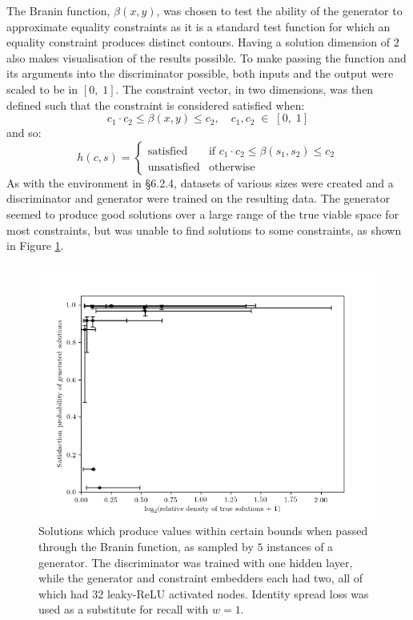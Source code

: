 \documentclass[../../main.tex]{subfiles}
\begin{document}
The Branin function, $\beta(x,y)$, was chosen to test the ability of the generator to approximate equality constraints as it is a standard test function for which an equality constraint produces distinct contours.
Having a solution dimension of $2$ also makes visualisation of the results possible.
To make passing the function and its arguments into the discriminator possible, both inputs and the output were scaled to be in $[0,\;1]$.
The constraint vector, in two dimensions, was then defined such that the constraint is considered satisfied when:
$$c_1\cdot c_2\le\beta(x,y)\le c_2,\quad c_1,c_2\;\in\;[0,\;1]$$
and so:
$$h(c,s)=\left\{\begin{array}{ll}\text{satisfied}&\mbox{if }c_1\cdot c_2\le\beta(s_1,s_2)\le c_2\\\text{unsatisfied}&\mbox{otherwise}\end{array}\right.$$
As with the environment in \S6.2.4, datasets of various sizes were created and a discriminator and generator were trained on the resulting data.
The generator seemed to produce good solutions over a large range of the true viable space for most constraints, but was unable to find solutions to some constraints, as shown in Figure \ref{fig:braninPropertiesW3}.
\begin{figure}[H]
    \begin{center}
    \includegraphics[width=\textwidth]{braninPropertiesW1}
    \caption{
        Solutions which produce values within certain bounds when passed through the Branin function, as sampled by $5$ instances of a generator.
        The discriminator was trained with one hidden layer, while the generator and constraint embedders each had two, all of which had 32 leaky-ReLU activated nodes.
        Identity spread loss was used as a substitute for recall with $w=1$.
    }
    \label{fig:braninPropertiesW3}
    \end{center}
\end{figure}
\end{document}
